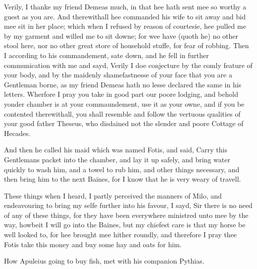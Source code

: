 Verily, I thanke my friend Demeas much, in that hee hath sent mee so worthy a
guest as you are. And therewithall hee commanded his wife to sit away and bid
mee sit in her place; which when I refused by reason of courtesie, hee pulled
me by my garment and willed me to sit downe; for wee have (quoth he) no other
stool here, nor no other great store of household stuffe, for fear of robbing.
Then I according to his commandement, sate down, and he fell in further
communication with me and sayd, Verily I doe conjecture by the comly feature of
your body, and by the maidenly shamefastnesse of your face that you are a
Gentleman borne, as my friend Demeas hath no lesse declared the same in his
letters. Wherfore I pray you take in good part our poore lodging, and behold
yonder chamber is at your commaundement, use it as your owne, and if you be
contented therewithall, you shall resemble and follow the vertuous qualities of
your good father Theseus, who disdained not the slender and poore Cottage of
Hecades.

And then he called his maid which was named Fotis, and said, Carry this
Gentlemans packet into the chamber, and lay it up safely, and bring water
quickly to wash him, and a towel to rub him, and other things necessary, and
then bring him to the next Baines, for I know that he is very weary of travell.

These things when I heard, I partly perceived the manners of Milo, and
endeavouring to bring my selfe further into his favour, I sayd, Sir there is no
need of any of these things, for they have been everywhere ministred unto mee
by the way, howbeit I will go into the Baines, but my chiefest care is that my
horse be well looked to, for hee brought mee hither roundly, and therefore I
pray thee Fotis take this money and buy some hay and oats for him.


How Apuleius going to buy fish, met with his companion Pythias.

